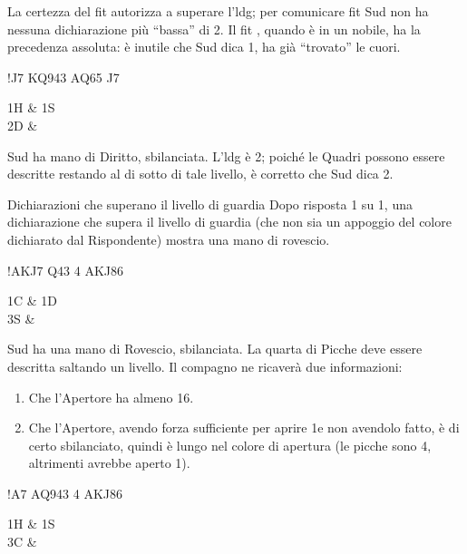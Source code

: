 \documentclass[../corsofiori.tex]{subfiles}
\begin{document}
La certezza del fit autorizza a superare l'\ac{ldg}; per comunicare fit Sud non ha nessuna dichiarazione più “bassa” di
2\He. Il fit , quando
è in un nobile, ha la precedenza assoluta: è
inutile che Sud dica 1\Sp, ha già “trovato” le
cuori.

\begin{center}
\hand!{J7} {KQ943} {AQ65} {J7}\quad \begin{biddingpair}
    1H & 1S\\
    2D & \\
\end{biddingpair}
\end{center}

Sud ha mano di Diritto, sbilanciata.
L'\ac{ldg} è 2\He; poiché le Quadri
possono essere descritte restando al di sotto
di tale livello, è corretto che Sud dica 2\Di.

\begin{regola}{Dichiarazioni che superano il livello di guardia}
Dopo risposta 1 su 1, una dichiarazione che supera il livello di guardia (che non sia un appoggio del colore dichiarato
dal Rispondente) mostra una mano di rovescio.
\end{regola}
\begin{center}
\hand!{AKJ7} {Q43} {4} {AKJ86}\quad\begin{biddingpair}
1C & 1D\\
3S & \\
\end{biddingpair}
\end{center}

Sud ha una mano di Rovescio, sbilanciata.
La quarta di Picche deve essere descritta
saltando un livello. Il compagno ne ricaverà
due informazioni:
\begin{enumerate}
\item Che l’Apertore ha almeno 16.
\item Che l’Apertore, avendo forza sufficiente per aprire 1\SA e non avendolo fatto, è di certo sbilanciato, quindi
    è lungo nel colore di apertura (le picche sono 4, altrimenti avrebbe aperto 1\Sp).
\end{enumerate}

\begin{center}
\hand!{A7} {AQ943} {4} {AKJ86}\quad\begin{biddingpair}
1H & 1S\\
3C & \\
\end{biddingpair}
\end{center}
\end{document}
